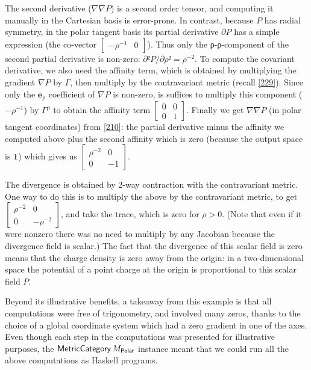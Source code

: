 \documentclass[nolinenum]{jfp}
\begin{document}
The second derivative (\(∇∇P\)) is a second order tensor, and
computing it manually in the Cartesian basis is error-prone. In contrast,
because \(P\) has radial symmetry, in the polar tangent basis its
partial derivative \(∂P\) has a simple expression (the co-vector \(\left[\begin{array}{cc}-ρ^{-1}&0\end{array}\right]\)).
Thus only the ρ-ρ-component of the second partial derivative is non-zero:
\(∂²P/∂ρ² = ρ^{-2}\). To compute the covariant derivative, we also need
the affinity term, which is obtained by multiplying the gradient
\(∇P\) by \(Γ\), then multiply by the contravariant metric
(recall \cref{229}).  Since only the \(\mathbf e_ρ\) coefficient of
\(∇P\) is non-zero, is suffices to multiply this component (\(-ρ^{-1}\)) by
\(Γ^\rho\) to obtain the affinity term \(\left[\begin{array}{cc}0&0\\0&1\end{array}\right]\).
Finally we get \(∇∇P\) (in polar tangent coordinates) from
\cref{210}: the partial derivative minus the affinity we computed above
plus the second affinity which is zero (because the output space is
\(\mathbf{1}\)) which gives us \(\left[\begin{array}{cc}ρ^{-2}&0\\0&-1\end{array}\right]\).

The divergence is obtained by 2-way contraction with the contravariant
metric. One way to do this is to multiply the above by the
contravariant metric, to get \(\left[\begin{array}{cc}ρ^{-2}&0\\0&-ρ^{-2}\end{array}\right]\),
and take the trace, which is zero for \(ρ>0\). (Note that even if
it were nonzero there was no need to multiply by any Jacobian because
the divergence field is scalar.) The fact that the divergence of this
scalar field is zero means that the charge density is zero away from
the origin: in a two-dimensional space the potential of a point charge at the origin is
proportional to this scalar field \(P\).

Beyond its illustrative benefits, a takeaway from this example is that
all computations were free of trigonometry, and involved many zeros,
thanks to the choice of a global coordinate system which had a zero gradient
in one of the axes.  Even though each step in the computations was presented for illustrative purposes, the
\(\mathsf{MetricCategory}\mskip 3.0muM_{\mathsf{Polar}}\) instance meant that we could run all
the above computations as Haskell programs.
\end{document}

